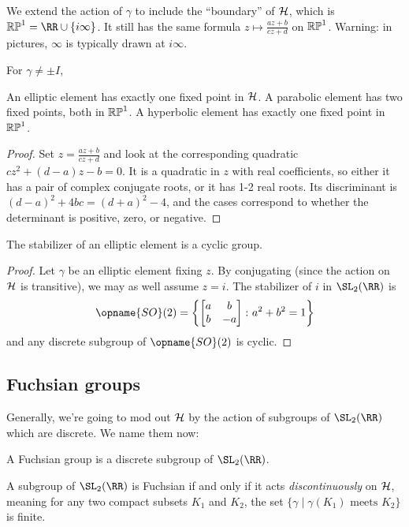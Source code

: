 We extend the action of $\gamma$ to include the ``boundary'' of $\mathcal H$,
which is $\RP^1 = \RR \cup \{i\infty\}$.
It still has the same formula $z \mapsto \frac{az+b}{cz+d}$ on $\mathbb{RP}^1$.
Warning: in pictures, $\infty$ is typically drawn at $i\infty$.
\begin{proposition}
  For $\gamma \ne \pm I$,
  \begin{itemize}
    \ii An elliptic element has exactly one fixed point in $\mathcal H$.
    \ii A parabolic element has two fixed points, both in $\mathbb{RP}^1$.
    \ii A hyperbolic element has exactly one fixed point in $\mathbb{RP}^1$.
  \end{itemize}
\end{proposition}
\begin{proof}
  Set $z = \frac{az+b}{cz+d}$ and look at the corresponding quadratic
  $cz^2 + (d-a)z - b = 0$.
  It is a quadratic in $z$ with real coefficients,
  so either it has a pair of complex conjugate roots, or it has 1-2 real roots.
  Its discriminant is $(d-a)^2 + 4bc = (d+a)^2 - 4$,
  and the cases correspond to whether the determinant is positive,
  zero, or negative.
\end{proof}

\begin{proposition}
  The stabilizer of an elliptic element is a cyclic group.
\end{proposition}
\begin{proof}
  Let $\gamma$ be an elliptic element fixing $z$.
  By conjugating (since the action on $\mathcal H$ is transitive),
  we may as well assume $z = i$.
  The stabilizer of $i$ in $\SL_2(\RR)$ is
  \[ \opname{SO}(2) = \left\{ \begin{bmatrix}
      a & b \\
      b & -a
    \end{bmatrix} \colon a^2+b^2=1 \right\} \]
  and any discrete subgroup of $\opname{SO}(2)$ is cyclic.
\end{proof}

\subsection{Fuchsian groups}
Generally, we're going to mod out $\mathcal H$ by the action of subgroups of $\SL_2(\RR)$
which are discrete. We name them now:
\begin{definition}
  A \alert{Fuchsian group} is a discrete subgroup of $\SL_2(\RR)$.
\end{definition}
\begin{proposition}
  A subgroup of $\SL_2(\RR)$ is Fuchsian
  if and only if it acts \emph{discontinuously} on $\mathcal H$,
  meaning for any two compact subsets $K_1$ and $K_2$,
  the set $\{ \gamma \mid \gamma(K_1) \text{ meets } K_2 \}$ is finite.
\end{proposition}

